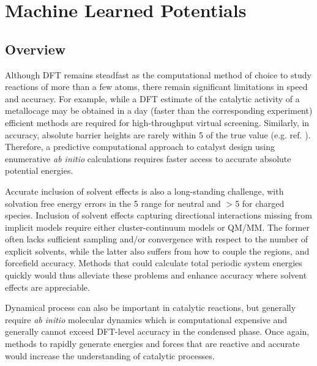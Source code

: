 \documentclass[../../main.tex]{subfiles}
\begin{document}
\setcounter{footnote}{0} 
\newcommand{\rom}[1]{\uppercase\expandafter{\romannumeral #1\relax}}


\chapter{Machine Learned Potentials}

\section{Overview}

Although DFT remains steadfast as the computational method of choice to study reactions of more than a few atoms,\cite{PribramJones2015} there remain significant limitations in speed and accuracy.\cite{Mardirossian2017} For example, while a DFT estimate of the catalytic activity of a metallocage may be obtained in a day\cite{Young2019} (faster than the corresponding experiment) efficient methods are required for high-throughput virtual screening. Similarly, in accuracy, absolute barrier heights are rarely within 5 \kcalx of the true value (e.g. ref. \cite{Krongchon2017}). Therefore, a predictive computational approach to catalyst design using enumerative \emph{ab initio} calculations requires faster access to accurate absolute potential energies. 

Accurate inclusion of solvent effects is also a long-standing challenge, with solvation free energy errors in the 5 \kcalx range for neutral and $>$5 \kcalx for charged species.\cite{Takano2004, Zhang2017} Inclusion of solvent effects capturing directional interactions missing from implicit models require either cluster-continuum models or QM/MM. The former often lacks sufficient sampling and/or convergence with respect to the number of explicit solvents,\cite{Basdogan2018} while the latter also suffers from how to couple the regions, and forcefield accuracy.\cite{Thiel2009} Methods that could calculate total periodic system energies quickly would thus alleviate these problems and enhance accuracy where solvent effects are appreciable.

Dynamical process can also be important in catalytic reactions,\cite{Grajciar2018, Stirling2014} but generally require \emph{ab initio} molecular dynamics which is computational expensive and generally cannot exceed DFT-level accuracy in the condensed phase.\cite{Hassanali2014} Once again, methods to rapidly generate energies and forces that are reactive and accurate would increase the understanding of catalytic processes.
\end{document}
